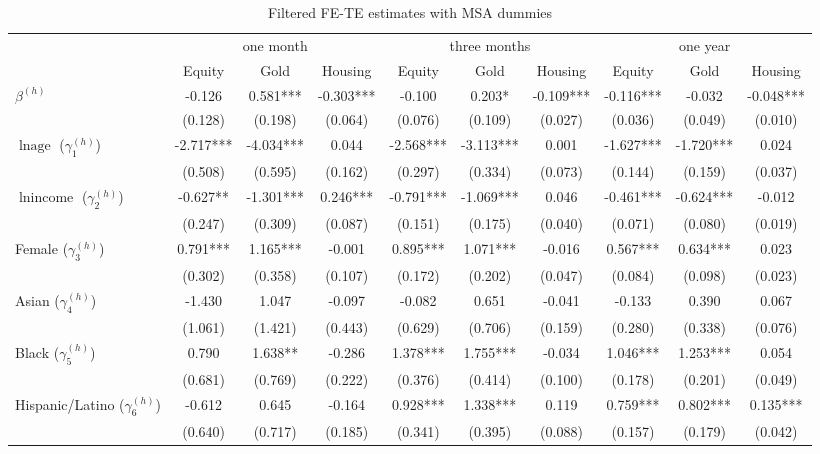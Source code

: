 \begin{table}[!h]\caption{Filtered FE-TE estimates with MSA dummies}\centering 
\begin{threeparttable} 
\begin{tabular}{|l|ccc|ccc|ccc|}\toprule 
& \multicolumn{3}{c}{one month} & \multicolumn{3}{c}{three months}&\multicolumn{3}{c}{one year}   \\  
 & Equity & Gold & Housing & Equity  & Gold & Housing & Equity & Gold & Housing \\\midrule 
$\beta^{(h)}$ & -0.126 & 0.581*** & -0.303*** & -0.100 & 0.203* & -0.109*** & -0.116*** & -0.032 & -0.048*** \\ 
 & (0.128) & (0.198) & (0.064)& (0.076) & (0.109) & (0.027)& (0.036) & (0.049) & (0.010) \\ 
$\ln \text{age}$ ($\gamma^{(h)}_1$) & -2.717*** & -4.034*** & 0.044 & -2.568*** & -3.113*** & 0.001 & -1.627*** & -1.720*** & 0.024 \\ 
 & (0.508) & (0.595) & (0.162)& (0.297) & (0.334) & (0.073)& (0.144) & (0.159) & (0.037) \\ 
$\ln \text{income}$ ($\gamma^{(h)}_2$) & -0.627** & -1.301*** & 0.246*** & -0.791*** & -1.069*** & 0.046 & -0.461*** & -0.624*** & -0.012 \\ 
 & (0.247) & (0.309) & (0.087)& (0.151) & (0.175) & (0.040)& (0.071) & (0.080) & (0.019) \\ 
Female ($\gamma^{(h)}_3$) & 0.791*** & 1.165*** & -0.001 & 0.895*** & 1.071*** & -0.016 & 0.567*** & 0.634*** & 0.023 \\ 
 & (0.302) & (0.358) & (0.107)& (0.172) & (0.202) & (0.047)& (0.084) & (0.098) & (0.023) \\ 
Asian ($\gamma^{(h)}_4$) & -1.430 & 1.047 & -0.097 & -0.082 & 0.651 & -0.041 & -0.133 & 0.390 & 0.067 \\ 
 & (1.061) & (1.421) & (0.443)& (0.629) & (0.706) & (0.159)& (0.280) & (0.338) & (0.076) \\ 
Black ($\gamma^{(h)}_5$) & 0.790 & 1.638** & -0.286 & 1.378*** & 1.755*** & -0.034 & 1.046*** & 1.253*** & 0.054 \\ 
 & (0.681) & (0.769) & (0.222)& (0.376) & (0.414) & (0.100)& (0.178) & (0.201) & (0.049) \\ 
Hispanic/Latino ($\gamma^{(h)}_6$) & -0.612 & 0.645 & -0.164 & 0.928*** & 1.338*** & 0.119 & 0.759*** & 0.802*** & 0.135*** \\ 
 & (0.640) & (0.717) & (0.185)& (0.341) & (0.395) & (0.088)& (0.157) & (0.179) & (0.042) \\ 

\end{tabular}
\end{threeparttable}
\end{table}
